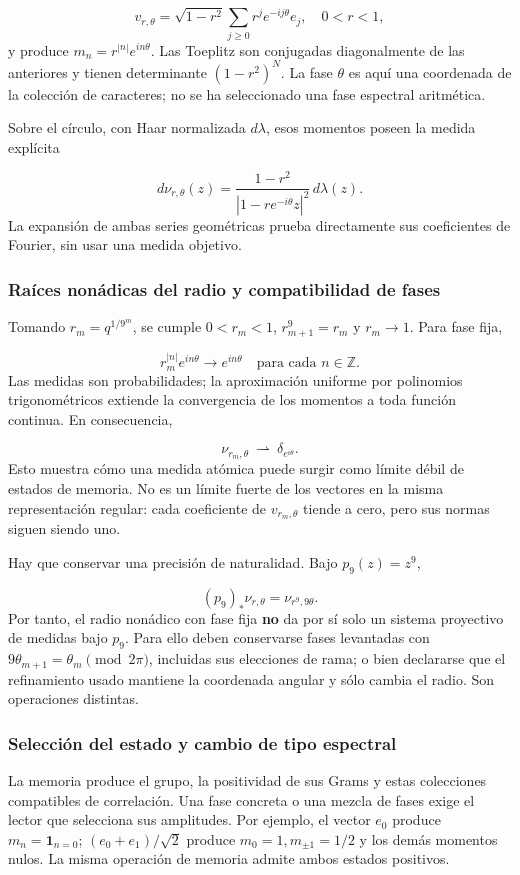\[
v_{r,\theta}=\sqrt{1-r^2}\sum_{j\ge0}r^j e^{-ij\theta}e_j,
\quad 0<r<1,
\]
y produce \(m_n=r^{|n|}e^{in\theta}\). Las Toeplitz son conjugadas diagonalmente de las anteriores y tienen determinante \((1-r^2)^N\). La fase \(\theta\) es aquí una coordenada de la colección de caracteres; no se ha seleccionado una fase espectral aritmética.

Sobre el círculo, con Haar normalizada \(d\lambda\), esos momentos poseen la medida explícita

\[
d\nu_{r,\theta}(z)
=\frac{1-r^2}{|1-r e^{-i\theta}z|^2}\,d\lambda(z).
\]
La expansión de ambas series geométricas prueba directamente sus coeficientes de Fourier, sin usar una medida objetivo.


\subsubsection{Raíces nonádicas del radio y compatibilidad de fases}
\label{tm-add-m3-1}
Tomando \(r_m=q^{1/9^m}\), se cumple \(0<r_m<1\), \(r_{m+1}^{9}=r_m\) y \(r_m\to1\). Para fase fija,

\[
r_m^{|n|}e^{in\theta}\longrightarrow e^{in\theta}
\quad\text{para cada }n\in\mathbb Z.
\]
Las medidas son probabilidades; la aproximación uniforme por polinomios trigonométricos extiende la convergencia de los momentos a toda función continua. En consecuencia,

\[
\nu_{r_m,\theta}\ \rightharpoonup\ \delta_{e^{i\theta}}.
\]
Esto muestra cómo una medida atómica puede surgir como límite débil de estados de memoria. No es un límite fuerte de los vectores en la misma representación regular: cada coeficiente de \(v_{r_m,\theta}\) tiende a cero, pero sus normas siguen siendo uno.

Hay que conservar una precisión de naturalidad. Bajo \(p_9(z)=z^9\),

\[
(p_9)_*\nu_{r,\theta}=\nu_{r^9,9\theta}.
\]
Por tanto, el radio nonádico con fase fija \textbf{no} da por sí solo un sistema proyectivo de medidas bajo \(p_9\). Para ello deben conservarse fases levantadas con \(9\theta_{m+1}=\theta_m\pmod{2\pi}\), incluidas sus elecciones de rama; o bien declararse que el refinamiento usado mantiene la coordenada angular y sólo cambia el radio. Son operaciones distintas.


\subsubsection{Selección del estado y cambio de tipo espectral}
\label{tm-add-m3-2}
La memoria produce el grupo, la positividad de sus Grams y estas colecciones compatibles de correlación. Una fase concreta o una mezcla de fases exige el lector que selecciona sus amplitudes. Por ejemplo, el vector \(e_0\) produce \(m_n=\mathbf1_{n=0}\); \((e_0+e_1)/\sqrt2\) produce \(m_0=1,m_{\pm1}=1/2\) y los demás momentos nulos. La misma operación de memoria admite ambos estados positivos.

